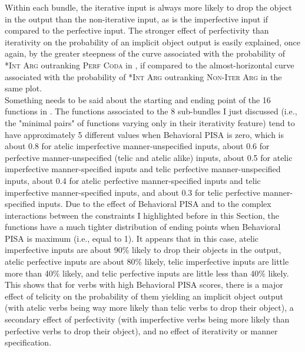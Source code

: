 Within each bundle, the iterative input is always more likely to drop the object in the output than the non-iterative input, as is the imperfective input if compared to the perfective input. The stronger effect of perfectivity than iterativity on the probability of an implicit object output is easily explained, once again, by the greater steepness of the curve associated with the probability of \textsc{*Int Arg} outranking \textsc{Perf Coda} in , if compared to the almost-horizontal curve associated with the probability of \textsc{*Int Arg} outranking \textsc{Non-Iter Arg} in the same plot.\\
Something needs to be said about the starting and ending point of the 16 functions in . The functions associated to the 8 sub-bundles I just discussed (i.e., the "minimal pairs" of functions varying only in their iterativity feature) tend to have approximately 5 different values when Behavioral PISA is zero, which is about 0.8 for atelic imperfective manner-unspecified inputs, about 0.6 for perfective manner-unspecified (telic and atelic alike) inputs, about 0.5 for atelic imperfective manner-specified inputs and telic perfective manner-unspecified inputs, about 0.4 for atelic perfective manner-specified inputs and telic imperfective manner-specified inputs, and about 0.3 for telic perfective manner-specified inputs. Due to the effect of Behavioral PISA and to the complex interactions between the constraints I highlighted before in this Section, the functions have a much tighter distribution of ending points when Behavioral PISA is maximum (i.e., equal to 1). It appears that in this case, atelic imperfective inputs are about 90\% likely to drop their objects in the output, atelic perfective inputs are about 80\% likely, telic imperfective inputs are little more than 40\% likely, and telic perfective inputs are little less than 40\% likely. This shows that for verbs with high Behavioral PISA scores, there is a major effect of telicity on the probability of them yielding an implicit object output (with atelic verbs being way more likely than telic verbs to drop their object), a secondary effect of perfectivity (with imperfective verbs being more likely than perfective verbs to drop their object), and no effect of iterativity or manner specification.\\
